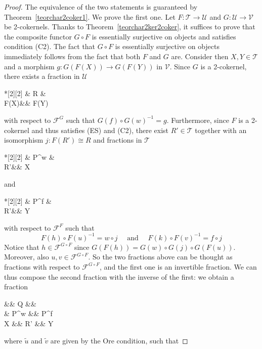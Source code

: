 \documentclass[11pt,reqno,a4paper]{amsart}
\newlength\verspace
\newcommand{\vsep}[1][1.0]{\vspace*{#1\verspace}\xspace}
\theoremstyle{definition}
\theoremstyle{remark}
\def\nameit#1{\textrm{#1}~}
\def\thex{\nameit{Theorem}}
\newcommand{\T}{\mathcal{T}}
\newcommand{\U}{\mathcal{U}}
\newcommand{\V}{\mathcal{V}}
\newcommand{\F}{\mathcal{F}}
\newcommand{\0}{\mathbf{0}}
\renewcommand{\1}{\mathbf{1}}
\def\:{\colon}
\def\c{\circ}
\newcommand{\iso}{\cong}
\newcommand{\aiso}[1]{\overset{#1}{\iso}}
\begin{document}
\begin{proof}
    The equivalence of the two statements is guaranteed by \thex \ref{teorchar2coker1}. We prove the first one. Let $F\:\T \to \U$ and $G\:\U \to \V$ be 2-cokernels. Thanks to \thex \ref{teorchar2ker2coker}, it suffices to prove that the composite functor $G \c F$ is essentially surjective on objects and satisfies condition (C2). The fact that $G\c F$ is essentially surjective on objects immediately follows from the fact that both $F$ and $G$ are. Consider then $X,Y\in \T$ and a morphism $g\: G(F(X)) \to G(F(Y))$ in $\V$. Since $G$ is a 2-cokernel, there exists a fraction in $\U$ \begin{cd}*[2][2] \& R \& \\[-2ex]
	F(X)\&\& F(Y)
	\arrow["w"', from=1-2, to=2-1]
	\arrow["f", from=1-2, to=2-3]\end{cd} with respect to $\mathcal{F}^G$ such that $G(f) \c G(w)^{-1}=g$. Furthermore, since $F$ is a 2-cokernel and thus satisfies (ES) and (C2), there exist $R'\in\T$ together with an isomorphism $j\: F(R') \aiso{} R$ and fractions in $\T$ \begin{cd}*[2][2] \& P^{w} \& \\[-2ex]
	R'\&\& X
	\arrow["u"', from=1-2, to=2-1]
	\arrow["h", from=1-2, to=2-3]\end{cd} and \begin{cd}*[2][2] \& P^{f} \& \\[-2ex]
	R'\&\& Y
	\arrow["v"', from=1-2, to=2-1]
	\arrow["k", from=1-2, to=2-3]\end{cd} with respect to $\F^{F}$ such that
    $$F(h) \c F(u)^{-1}= w\c j \quad \text{ and } \quad F(k) \c F(v)^{-1}= f\c j$$
    Notice that $h\in \F^{G\c F}$ since $G(F(h))=G(w) \c G(j) \c G(F(u))$. Moreover, also $u,v\in \mathcal{F}^{G \c F}$. So the two fractions above can be thought as fractions with respect to $\F^{G\c F}$, and the first one is an invertible fraction. We can thus compose the second fraction with the inverse of the first: we obtain a fraction
    \begin{cd}[4][4]
    \&\& Q \&\& \\
	\& {P^{w}} \&\& {P^{f}} \\
	X \&\& {R'} \&\& Y
	\arrow["{\tilde{v}}"', from=1-3, to=2-2]
	\arrow["{\tilde{u}}", from=1-3, to=2-4]
	\arrow["h"', from=2-2, to=3-1]
	\arrow["u", from=2-2, to=3-3]
	\arrow["v"', from=2-4, to=3-3]
	\arrow["k", from=2-4, to=3-5]
    \end{cd}
    where $\tilde{u}$ and $\tilde{v}$ are given by the Ore condition, such that\vsep[-1]

\end{proof}
\end{document}

